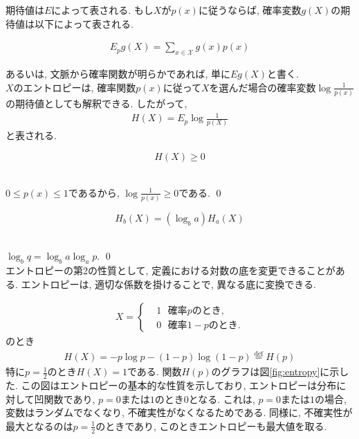 \documentclass[a4j]{jsarticle}
\begin{document}
期待値は$E$によって表される. もし$X$が$p(x)$に従うならば, 確率変数$g(X)$の期待値は以下によって表される.

\begin{align}
	E_{p}g(X) = \sum_{x \in \mathcal{X}} g(x) p(x)
\end{align}

あるいは, 文脈から確率関数が明らかであれば, 単に$Eg(X)$と書く.\\

 $X$のエントロピーは, 確率関数$p(x)$に従って$X$を選んだ場合の確率変数$\log \frac{1}{p(x)}$の期待値としても解釈できる. したがって,
\begin{align}
	H(X) = E_{p} \log \frac{1}{p(X)}
\end{align}
と表される.\\

\begin{itembox}[l]{}
	\begin{equation}
		H(X) \geq 0
	\end{equation}
\end{itembox}\\

 $0 \leq p(x) \leq 1$であるから, $\log \frac{1}{p(x)} \geq 0$である. \qed\\

\begin{itembox}[l]{}
	\begin{equation}
		H_b(X) = (\log_b a)H_a(X)
	\end{equation}
\end{itembox}\\

 $\log_b q = \log_b a \log_a p$. \qed\\

エントロピーの第2の性質として, 定義における対数の底を変更できることがある. エントロピーは, 適切な係数を掛けることで, 異なる底に変換できる.\\


\begin{align}
	X = \begin{cases}
		 & 1\:\:\:\mbox{確率}p\mbox{のとき},   \\
		 & 0\:\:\:\mbox{確率}1-p\mbox{のとき}.
	\end{cases}
\end{align}
のとき
\begin{align}
	H(X) = -p \log p - (1-p) \log (1-p) \stackrel{\mathrm{def}}{=} H(p)
\end{align}
特に$p = \frac{1}{2}$のとき$H(X) = 1$である. 関数$H(p)$のグラフは図\ref{fig:entropy}に示した. この図はエントロピーの基本的な性質を示しており, エントロピーは分布に対して凹関数であり, $p = 0$または$1$のとき$0$となる. これは, $p = 0$または$1$の場合, 変数はランダムでなくなり, 不確実性がなくなるためである. 同様に, 不確実性が最大となるのは$p = \frac{1}{2}$のときであり, このときエントロピーも最大値を取る.\\
\end{document}
